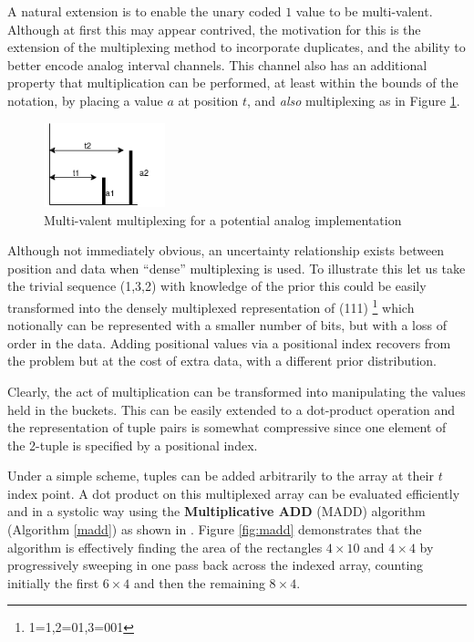 \documentclass{article}
\begin{document}
A natural extension is to enable the unary coded $1$ value to be multi-valent. Although at first this may appear contrived, the motivation for this is the extension of the multiplexing method to incorporate duplicates, and the ability to better encode analog interval channels. This channel also has an additional property that multiplication can be performed, at least within the bounds of the notation, by placing a value $a$ at position $t$, and \textit{also} multiplexing as in Figure \ref{fig:multiply}.


\begin{figure}[ht]
  \centerline{\includegraphics[width=100pt]{figures/multiplex2.png}}
  \caption{Multi-valent multiplexing for a potential analog implementation}\label{fig:multiply}
\end{figure}

Although not immediately obvious, an uncertainty relationship exists between position and data when ``dense'' multiplexing is used. To illustrate this let us take the trivial sequence (1,3,2) with knowledge of the prior this could be easily transformed into the densely multiplexed representation of (111) \footnote{1=1,2=01,3=001} which notionally can be represented with a smaller number of bits, but with a loss of order in the data. Adding positional values via a positional index recovers from the problem but at the cost of extra data, with a different prior distribution.

Clearly, the act of multiplication can be transformed into manipulating the values held in the buckets. This can be easily extended to a dot-product operation and the representation of tuple pairs is somewhat compressive since one element of the 2-tuple is specified by a positional index.

Under a simple scheme, tuples can be added arbitrarily to the array at their $t$ index point.  A dot product on this multiplexed array can be evaluated efficiently and in a systolic way using the \textbf{Multiplicative ADD} (MADD) algorithm (Algorithm \ref{madd}) as shown in \cite{jonny-asynch}. Figure \ref{fig:madd} demonstrates that the algorithm is effectively finding the area of the rectangles $4 \times 10$ and $4 \times 4$ by progressively sweeping in one pass back across the indexed array, counting initially the first $6 \times 4$ and then the remaining $8 \times 4$.
\end{document}
